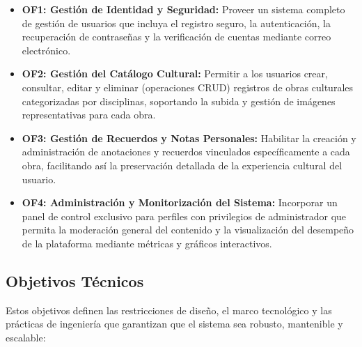 \begin{itemize}
    \item \textbf{OF1: Gestión de Identidad y Seguridad:} Proveer un sistema completo de gestión de usuarios que incluya el registro seguro, la autenticación, la recuperación de contraseñas y la verificación de cuentas mediante correo electrónico.
    
    \item \textbf{OF2: Gestión del Catálogo Cultural:} Permitir a los usuarios crear, consultar, editar y eliminar (operaciones CRUD) registros de obras culturales categorizadas por disciplinas, soportando la subida y gestión de imágenes representativas para cada obra.
    
    \item \textbf{OF3: Gestión de Recuerdos y Notas Personales:} Habilitar la creación y administración de anotaciones y recuerdos vinculados específicamente a cada obra, facilitando así la preservación detallada de la experiencia cultural del usuario.
    
    \item \textbf{OF4: Administración y Monitorización del Sistema:} Incorporar un panel de control exclusivo para perfiles con privilegios de administrador que permita la moderación general del contenido y la visualización del desempeño de la plataforma mediante métricas y gráficos interactivos.
\end{itemize}

\subsection{Objetivos Técnicos}
\label{sec:objetivosTecnicos}

Estos objetivos definen las restricciones de diseño, el marco tecnológico y las prácticas de ingeniería que garantizan que el sistema sea robusto, mantenible y escalable:

